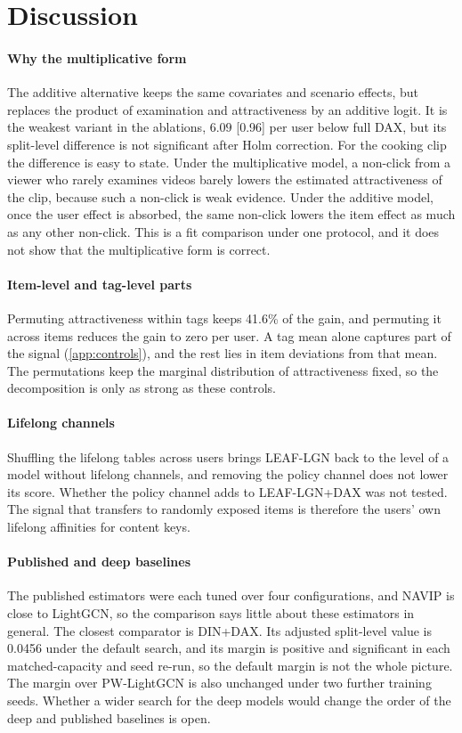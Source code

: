 \section{Discussion}
\label{sec:discussion}

\paragraph{Why the multiplicative form} The additive alternative keeps the same covariates and scenario effects, but replaces the product of
examination and attractiveness by an additive logit. It is the weakest variant in the ablations, $6.09$ [0.96] per user below full DAX, but its split-level
difference is not significant after Holm correction. For the cooking clip the difference is easy to state. Under the multiplicative model, a
non-click from a viewer who rarely examines videos barely lowers the estimated attractiveness of the clip, because such a non-click is weak
evidence. Under the additive model, once the user effect is absorbed, the same non-click lowers the item effect as much as any other
non-click. This is a fit comparison under one protocol, and it does not show that the multiplicative form is correct.

\paragraph{Item-level and tag-level parts} Permuting attractiveness within tags keeps 41.6\% of the gain, and permuting it across items reduces the gain to zero per user. A tag mean alone captures part of the signal (\ref{app:controls}), and the rest lies in item deviations from that
mean. The permutations keep the marginal distribution of attractiveness fixed, so the decomposition is only as strong as these controls.

\paragraph{Lifelong channels} Shuffling the lifelong tables across users brings LEAF-LGN back to the level of a model without lifelong channels, and removing the policy channel
does not lower its score. Whether the policy channel adds to LEAF-LGN+DAX was not tested. The signal that transfers to randomly exposed items
is therefore the users' own lifelong affinities for content keys.

\paragraph{Published and deep baselines} The published estimators were each tuned over four configurations, and NAVIP is close to LightGCN, so
the comparison says little about these estimators in general. The closest comparator is DIN+DAX. Its adjusted split-level value is 0.0456 under the default search, and its margin is positive and significant in each matched-capacity and seed re-run, so the default margin is not the whole picture. The margin over PW-LightGCN is also unchanged under two further training seeds.
Whether a wider search for the deep models would change the order of the deep and published baselines is open.

